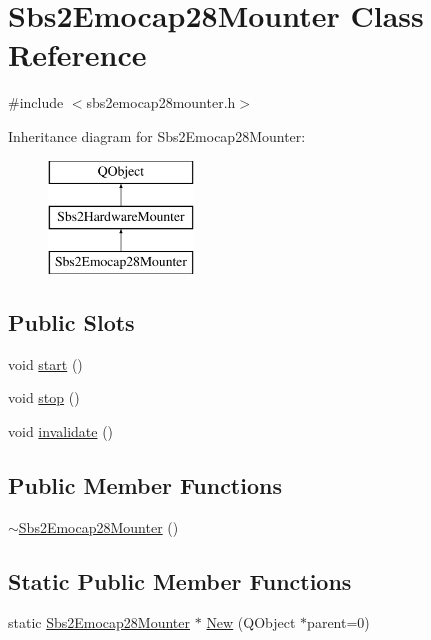 \hypertarget{classSbs2Emocap28Mounter}{\section{Sbs2\-Emocap28\-Mounter Class Reference}
\label{classSbs2Emocap28Mounter}
}


{\ttfamily \#include $<$sbs2emocap28mounter.\-h$>$}

Inheritance diagram for Sbs2\-Emocap28\-Mounter\-:\begin{figure}[H]
\begin{center}
\leavevmode
\includegraphics[height=3.000000cm]{classSbs2Emocap28Mounter}
\end{center}
\end{figure}
\subsection*{Public Slots}
\begin{DoxyCompactItemize}
\item 
void \hyperlink{classSbs2Emocap28Mounter_ac2b7d1c8782d36542a0ad05a0c79cf47}{start} ()
\item 
void \hyperlink{classSbs2Emocap28Mounter_af7257b300b705f53d249453ba3fe592f}{stop} ()
\item 
void \hyperlink{classSbs2Emocap28Mounter_a13242b6aa959934acf359f48690c0e8f}{invalidate} ()
\end{DoxyCompactItemize}
\subsection*{Public Member Functions}
\begin{DoxyCompactItemize}
\item 
\hyperlink{classSbs2Emocap28Mounter_aff080ed4f71f6b95c311c5200b04b7ff}{$\sim$\-Sbs2\-Emocap28\-Mounter} ()
\end{DoxyCompactItemize}
\subsection*{Static Public Member Functions}
\begin{DoxyCompactItemize}
\item 
static \hyperlink{classSbs2Emocap28Mounter}{Sbs2\-Emocap28\-Mounter} $\ast$ \hyperlink{classSbs2Emocap28Mounter_ab86f604bf4b29cd4cc1acdcbe91354f0}{New} (Q\-Object $\ast$parent=0)
\end{DoxyCompactItemize}
